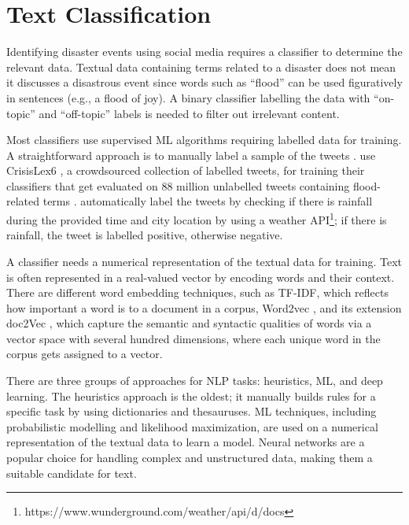 \section{Text Classification}
Identifying disaster events using social media requires a classifier to determine the relevant data.
Textual data containing terms related to a disaster does not mean it discusses a disastrous event
since words such as ``flood'' can be used figuratively in sentences (e.g., a flood of joy). A binary
classifier labelling the data with ``on-topic'' and ``off-topic'' labels is needed to filter out
irrelevant content.

Most classifiers use supervised \ac{ML} algorithms requiring labelled data for training. A
straightforward approach is to manually label a sample of the tweets
\cite{barkerDevelopmentNationalscaleRealtime2019}\cite{debruijnGlobalDatabaseHistoric2019b}.
 use CrisisLex6
\cite{olteanuCrisisLexLexiconCollecting2014}, a crowdsourced collection of labelled tweets, for
training their classifiers that get evaluated on 88 million unlabelled tweets containing
flood-related terms \cite{DVN/T3ZFMR_2019}.  automatically
label the tweets by checking if there is rainfall during the provided time and city location by
using a weather \ac{API}\footnote{https://www.wunderground.com/weather/api/d/docs}; if there is
rainfall, the tweet is labelled positive, otherwise negative.

A classifier needs a numerical representation of the textual data for training. Text is often
represented in a real-valued vector by encoding words and their context. There are different word
embedding techniques, such as \ac{TF-IDF}, which reflects how important a word is to a document in a
corpus, Word2vec \cite{mikolovEfficientEstimationWord2013}, and its extension doc2Vec
\cite{leDistributedRepresentationsSentences2014}, which capture the semantic and syntactic qualities
of words via a vector space with several hundred dimensions, where each unique word in the corpus
gets assigned to a vector.

There are three groups of approaches for \ac{NLP} tasks: heuristics, \ac{ML}, and deep learning. The
heuristics approach is the oldest; it manually builds rules for a specific task by using
dictionaries and thesauruses. \ac{ML} techniques, including probabilistic modelling and likelihood
maximization, are used on a numerical representation of the textual data to learn a model. Neural
networks are a popular choice for handling complex and unstructured data, making them a suitable
candidate for text.

